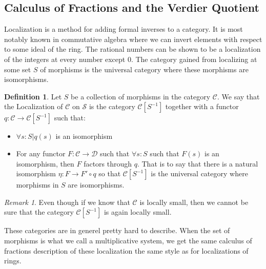 \documentclass[12pt]{article}
\theoremstyle{definition}
\newtheorem{definition}{Definition}[section]
\theoremstyle{remark}
\newtheorem*{remark}{Remark}
\begin{document}
        \subsection{Calculus of Fractions and the Verdier Quotient}
            Localization is a method for adding formal inverses to a category. It is most notably known in commutative algebra where we can invert elements with respect to some ideal of the ring. The rational numbers can be shown to be a localization of the integers at every number except 0. The category gained from localizing at some set $S$ of morphisms is the universal category where these morphisms are isomorphisms.
            \begin{definition}
                Let $S$ be a collection of morphisms in the category $\mathcal{C}$. We say that the Localization of $\mathcal{C}$ on $\mathcal{S}$ is the category $\mathcal{C}[S^{-1}]$ together with a functor $q:\mathcal{C}\rightarrow \mathcal{C}[S^{-1}]$ such that:
                \begin{itemize}
                    \item $\forall s:S|q(s)$ is an isomorphism
                    \item For any functor $F:\mathcal{C}\rightarrow\mathcal{D}$ such that $\forall s:S$ such that $F(s)$ is an isomorphism, then $F$ factors through $q$. That is to say that there is a natural isomorphism $\eta : F\rightarrow F'\circ q$ so that $\mathcal{C}[S^{-1}]$ is the universal category where morphisms in $S$ are isomorphisms.
                \end{itemize}
                \begin{center}
                \end{center}
            \end{definition}

            \begin{remark}
                Even though if we know that $\mathcal{C}$ is locally small, then we cannot be sure that the category $\mathcal{C}[S^{-1}]$ is again locally small.
            \end{remark}

            These categories are in generel pretty hard to describe. When the set of morphisms is what we call a multiplicative system, we get the same calculus of fractions description of these localization the same style as for localizations of rings.
\end{document}
